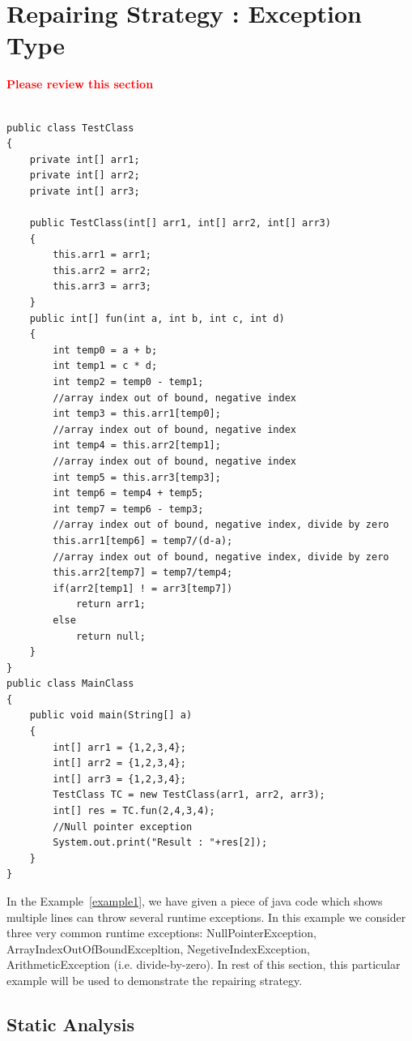 

\chapter{Repairing Strategy : Exception Type}
\label{chapter:strgEx}

\textcolor{red}{\textbf{Please review this section}}\newline


\lstset{language=Java, caption=Java code which may throws runtime exceptions, label=example1}
\begin{lstlisting}

public class TestClass
{
	private int[] arr1;
	private int[] arr2;
	private int[] arr3;
		
	public TestClass(int[] arr1, int[] arr2, int[] arr3)
	{
		this.arr1 = arr1;
		this.arr2 = arr2;
		this.arr3 = arr3;
	}
	public int[] fun(int a, int b, int c, int d)
	{
		int temp0 = a + b;
		int temp1 = c * d;
		int temp2 = temp0 - temp1;
		//array index out of bound, negative index
		int temp3 = this.arr1[temp0];
		//array index out of bound, negative index
		int temp4 = this.arr2[temp1];
		//array index out of bound, negative index
		int temp5 = this.arr3[temp3];
		int temp6 = temp4 + temp5;
		int temp7 = temp6 - temp3;
		//array index out of bound, negative index, divide by zero
		this.arr1[temp6] = temp7/(d-a);
		//array index out of bound, negative index, divide by zero
		this.arr2[temp7] = temp7/temp4;
		if(arr2[temp1] ! = arr3[temp7])
			return arr1;
		else
			return null;
	}
}
public class MainClass 
{
	public void main(String[] a) 
	{
		int[] arr1 = {1,2,3,4};
		int[] arr2 = {1,2,3,4};
		int[] arr3 = {1,2,3,4};
		TestClass TC = new TestClass(arr1, arr2, arr3);
		int[] res = TC.fun(2,4,3,4);
		//Null pointer exception
		System.out.print("Result : "+res[2]);
	}    
}
\end{lstlisting}

In the Example~\ref{example1}, we have given a piece of java code which shows
multiple lines can throw several runtime exceptions.
In this example we consider three very common runtime exceptions:
NullPointerException, ArrayIndexOutOfBoundExcepltion, NegetiveIndexException,
ArithmeticException (i.e. divide-by-zero). In rest of this section, this
particular example will be used to demonstrate the repairing strategy.

\section{Static Analysis}
\label{subsec:symb}


